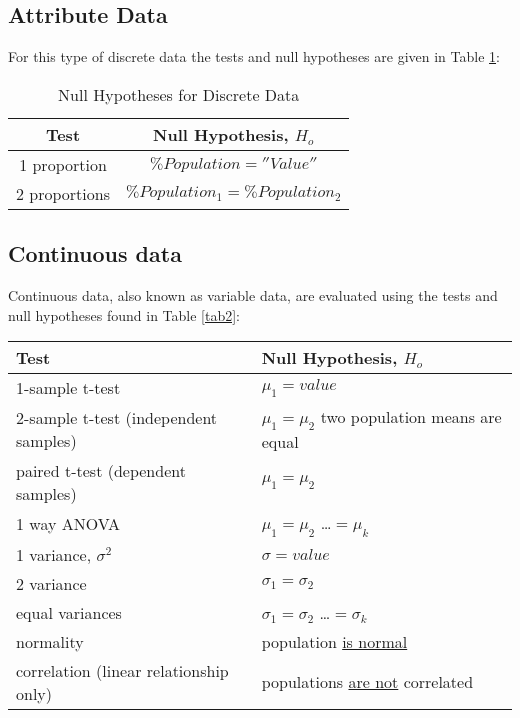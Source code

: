 \subsection{Attribute Data}
For this type of discrete data the tests and null hypotheses are given in Table \ref{tab1}:\\

\begin{table}[h]\caption{Null Hypotheses for Discrete Data}\label{tab1}
\begin{center}
\begin{tabular}{|c|c|}
\hline \textbf{Test} & \textbf{Null Hypothesis}, $H_{o}$  \\ 
\hline 1 proportion & $\%Population =  ''Value'' $\\ 
\hline 2 proportions & $\%Population_{1} = \%Population_{2}$ \\ 
\hline 
\end{tabular} 
\end{center}
\end{table}
\subsection{Continuous data}
Continuous data, also known as variable data, are evaluated using the tests and null hypotheses found in Table \ref{tab2}:
\begin{sidewaystable}[h]\caption{Null Hypotheses for Continuous Data}\label{tab2}
\begin{center}
\begin{tabular}{|l|l|}
\hline \textbf{Test} & \textbf{Null Hypothesis}, $H_{o}$ \\ 
\hline 1-sample t-test & $\mu_{1} = value$ \\ 
\hline 2-sample t-test (independent samples) & $\mu_{1} = \mu_{2}$ two population means are equal \\ 
\hline paired t-test (dependent samples) & $\mu_{1} = \mu_{2}$ \\ 
\hline 1 way ANOVA & $\mu_{1} = \mu_{2}$  \dots $= \mu_{k}$ \\ 
\hline 1 variance, $\sigma^{2}$ &  $ \sigma =  value$ \\ 
\hline 2 variance & $\sigma_{1} = \sigma_{2}$ \\ 
\hline equal variances & $\sigma_{1} = \sigma_{2}$ \dots $= \sigma_{k}$  \\ 
\hline normality & population \underline{is normal} \\ 
\hline correlation (linear relationship only) & populations \underline{are not} correlated  \\ 
\hline 
\end{tabular} 
\end{center}
\end{sidewaystable}

